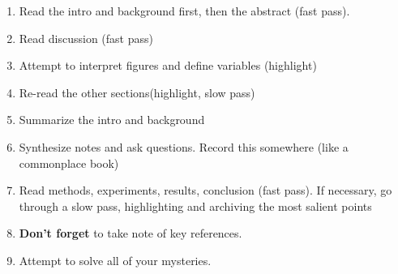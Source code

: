 \begin{enumerate}
\item Read the intro and background first, then the abstract (fast pass).
\item Read discussion (fast pass)
\item Attempt to interpret figures and define variables (highlight)
\item Re-read the other sections(highlight, slow pass)
\item Summarize the intro and background
\item Synthesize notes and ask questions. Record this somewhere (like a commonplace book)
\item Read methods, experiments, results, conclusion (fast pass). If necessary, go through a slow pass, highlighting and archiving the most salient points
\item \textbf{Don't forget} to take note of key references.
\item Attempt to solve all of your mysteries.
\end{enumerate}
